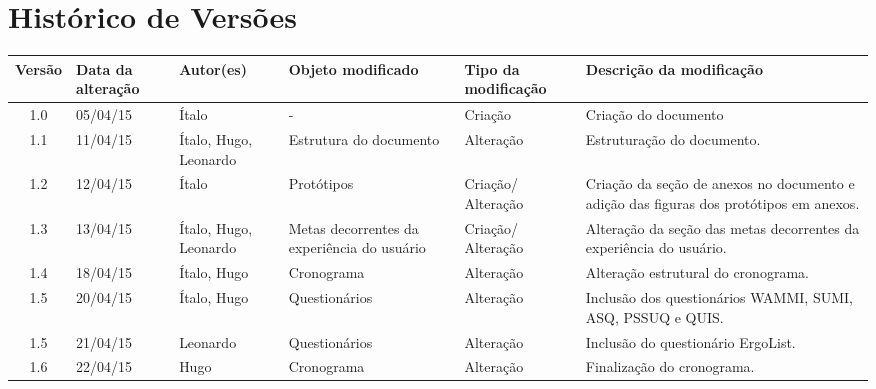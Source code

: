 \chapter{Histórico de Versões}

\begin{longtable}{|c|m{2cm}|m{2.8cm}|m{2.3cm}|m{2.44cm}|m{4.2cm}|}

  \hline
  \textbf{Versão} & \textbf{Data da alteração} & \textbf{Autor(es)} & \textbf{Objeto modificado} & \textbf{Tipo da modificação} & \textbf{Descrição da modificação}\\
  
  \hline                               
  1.0 & 05/04/15 & Ítalo & - & Criação & Criação do documento\\
  
  \hline                               
  1.1 & 11/04/15 & Ítalo, Hugo, Leonardo & Estrutura do documento & Alteração & Estruturação do documento.\\
  
  \hline                               
  1.2 & 12/04/15 & Ítalo & Protótipos & Criação/ Alteração & Criação da seção de anexos no documento e adição das figuras dos protótipos em anexos.\\
 
  \hline                               
  1.3 & 13/04/15 & Ítalo, Hugo, Leonardo & Metas decorrentes da experiência do usuário & Criação/ Alteração & Alteração da seção das metas decorrentes da experiência do usuário.\\
 
  \hline                               
  1.4 & 18/04/15 & Ítalo, Hugo & Cronograma & Alteração & Alteração estrutural do cronograma.\\
 
  \hline                               
  1.5 & 20/04/15 & Ítalo, Hugo & Questionários & Alteração & Inclusão dos questionários WAMMI, SUMI, ASQ, PSSUQ e QUIS.\\
 
  \hline                               
  1.5 & 21/04/15 & Leonardo & Questionários & Alteração & Inclusão do questionário ErgoList.\\
 
  \hline                               
  1.6 & 22/04/15 & Hugo & Cronograma & Alteração & Finalização do cronograma.\\
  

\end{longtable}
